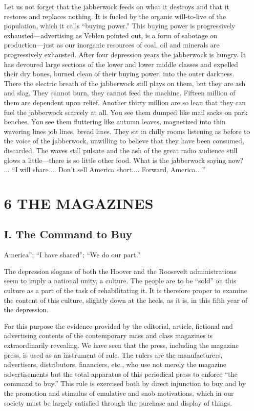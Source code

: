 \documentclass[nohyper,openany,nobib]{tufte-book}
\let\oldchapter\chapter
\def\chapter{%
  \setcounter{footnote}{0}%
  \oldchapter
}
\begin{document}
Let us not forget that the jabberwock feeds on what it destroys and that
it restores and replaces nothing. It is fueled by the organic
will-to-live of the population, which it calls ``buying power.'' This
buying power is progressively exhausted---advertising as Veblen pointed
out, is a form of sabotage on production---just as our inorganic
resources of coal, oil and minerals are progressively exhausted. After
four depression years the jabberwock is hungry. It has devoured large
sections of the lower and lower middle classes and expelled their dry
bones, burned clean of their buying power, into the outer darkness.
There the electric breath of the jabberwock still plays on them, but
they are ash and slag. They cannot burn, they cannot feed the machine.
Fifteen million of them are dependent upon relief. Another thirty
million are so lean that they can fuel the jabberwock scarcely at all.
You see them dumped like mail sacks on park benches. You see them
fluttering like autumn leaves, magnetized into thin wavering lines job
lines, bread lines. They sit in chilly rooms listening as before to the
voice of the jabberwock, unwilling to believe that they have been
consumed, discarded. The waves still pulsate and the ash of the great
radio audience still glows a little---there is so little other food.
What is the jabberwock saying now? ... ``I will share.... Don't sell
America short.... Forward, America....''



\chapter[6 \hspace*{1mm} THE MAGAZINES]{6 THE MAGAZINES}

\section{I. The Command to Buy}

 America''; ``I have shared''; ``We do our part.''

The depression slogans of both the Hoover and the Roosevelt
administrations seem to imply a national unity, a culture. The people
are to be ``sold'' on this culture as a part of the task of
rehabilitating it. It is therefore proper to examine the content of this
culture, slightly down at the heels, as it is, in this fifth year of the
depression.

For this purpose the evidence provided by the editorial, article,
fictional and advertising contents of the contemporary mass and class
magazines is extraordinarily revealing. We have seen that the press,
including the magazine press, is used as an instrument of rule. The
rulers are the manufacturers, advertisers, distributors, financiers,
etc., who use not merely the magazine advertisements but the total
apparatus of this periodical press to enforce ``the command to buy.''
This rule is exercised both by direct injunction to buy and by the
promotion and stimulus of emulative and snob motivations, which in our
society must be largely satisfied through the purchase and display of
things.
\end{document}
